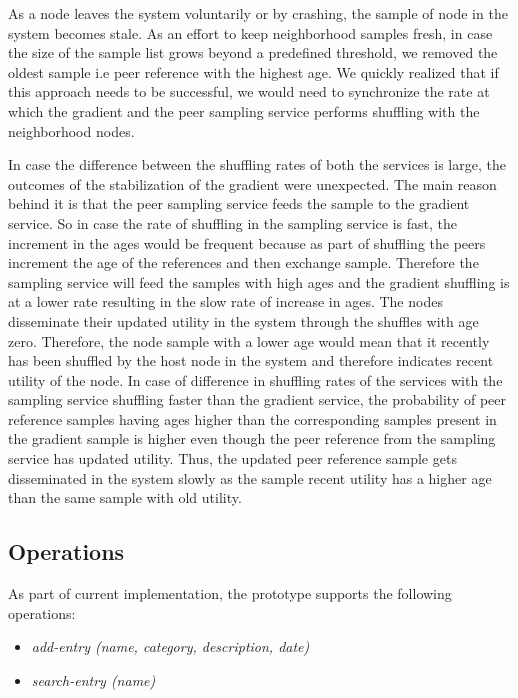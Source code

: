 \documentclass[12pt,a4paper,twoside,openright]{book}
\begin{document}
\par  As a node leaves the system voluntarily or by crashing, the sample of node in the system becomes stale. As an effort to keep neighborhood samples fresh, in case the size of the sample list grows beyond a predefined threshold, we removed the oldest sample i.e peer reference with the highest age. We quickly realized that if this approach needs to be successful, we would need to synchronize the rate at which the gradient and the peer sampling service performs shuffling with the neighborhood nodes.

\par In case the difference between the shuffling rates of both the services is large, the outcomes of the stabilization of the gradient were unexpected. The main reason behind it is that the peer sampling service feeds the sample to the gradient service. So in case the rate of shuffling in the sampling service is fast, the increment in the ages would be frequent because as part of shuffling the peers increment the age of the references and then exchange sample. Therefore the sampling service will feed the samples with high ages and the gradient shuffling is at a lower rate resulting in the slow rate of increase in ages. The nodes disseminate their updated utility in the system through the shuffles with age zero. Therefore, the node sample with a lower age would mean that it recently has been shuffled by the host node in the system and therefore indicates recent utility of the node. In case of difference in shuffling rates of the services with the sampling service shuffling faster than the gradient service, the probability of peer reference samples having ages higher than the corresponding samples present in the gradient sample is higher even though the peer reference from the sampling service has updated utility. Thus, the updated peer reference sample gets disseminated in the system slowly as the sample recent utility has a higher age than the same sample with old utility.

\subsection{Operations}
As part of current implementation, the prototype supports the following operations:

\begin{itemize}

\item \textit{add-entry (name, category, description, date)}
\item \textit{search-entry (name)}

\end{itemize}
\end{document}
